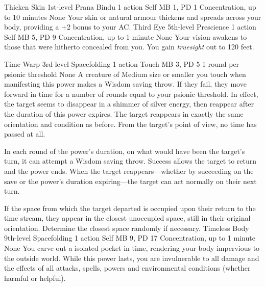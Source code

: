 \DndPowerHeader%
    {Thicken Skin\label{pwr:thicken_skin}}
    {1st-level Prana Bindu}
    {1 action}
    {Self}
    {MB 1, PD 1}
    {Concentration, up to 10 minutes}
    {None}
Your skin or natural armour thickens and spreads
across your body, providing a +2 bonus to your AC.
\DndPowerHeader%
    {Third Eye\label{pwr:third_eye}}
    {5th-level Prescience}
    {1 action}
    {Self}
    {MB 5, PD 9}
    {Concentration, up to 1 minute}
    {None}
Your vision awakens to those that were hitherto
concealed from you. You gain \emph{truesight} out to 120 feet.

\DndPowerHeader%
    {Time Warp\label{pwr:time_warp}}
    {3rd-level Spacefolding}
    {1 action}
    {Touch}
    {MB 3, PD 5}
    {1 round per psionic threshold}
    {None}
A creature of Medium size or smaller you
touch when manifesting this power makes a Wisdom saving throw.
If they fail, they move forward in time for a number of rounds
equal to your psionic threshold. In effect, the target seems
to disappear in a shimmer of silver energy, then reappear
after the duration of this power expires. The target reappears
in exactly the same orientation and condition as before. From
the target's point of view, no time has passed at all.

In each round of the power's duration, on what would have
been the target's turn, it can attempt a Wisdom saving throw.
Success allows the target to return and the power ends. When
the target reappears---whether by succeeding on the save or
the power's duration expiring---the target can act normally
on their next turn.

If the space from which the target departed is occupied upon
their return to the time stream, they appear in the closest
unoccupied space, still in their original orientation. Determine
the closest space randomly if necessary.
\DndPowerHeader%
    {Timeless Body\label{pwr:timeless_body}}
    {9th-level Spacefolding}
    {1 action}
    {Self}
    {MB 9, PD 17}
    {Concentration, up to 1 minute}
    {None}
You carve out a isolated pocket in time,
rendering your body impervious to the outside world. While
this power lasts, you are invulnerable to all damage and the
effects of all attacks, spells, powers and environmental conditions
(whether harmful or helpful).

